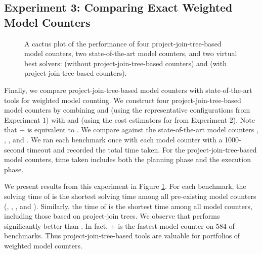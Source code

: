 
\subsection{Experiment 3: Comparing Exact Weighted Model Counters}
\label{sec_experiments_wmc}

\begin{figure}[t]
	\centering
	
    \vspace*{-1cm}
	\caption{\label{fig:comparison} A cactus plot of the performance of four project-join-tree-based model counters, two state-of-the-art model counters, and two virtual best solvers:  (without project-join-tree-based counters) and  (with project-join-tree-based counters).}
\end{figure}

Finally, we compare project-join-tree-based model counters with state-of-the-art tools for weighted model counting.
We construct four project-join-tree-based model counters by combining \Htb{} and \Lg{} (using the representative configurations from Experiment 1) with \Dmc{} and \Tensor{} (using the cost estimators for \Lg{} from Experiment 2).
Note that \Dmc{}+\Htb{} is equivalent to  \cite{DPV20}.
We compare against the state-of-the-art model counters \cachet{} \cite{sang2004combining}, \ctd{} \cite{darwiche2004new}, \df{} \cite{LM17}, and \minictd{} \cite{OD15}.
We ran each benchmark once with each model counter with a 1000-second timeout and recorded the total time taken.
For the project-join-tree-based model counters, time taken includes both the planning phase and the execution phase.

We present results from this experiment in Figure \ref{fig:comparison}.
For each benchmark, the solving time of  is the shortest solving time among all pre-existing model counters (\cachet, \ctd, \df, and \minictd).
Similarly, the time of  is the shortest time among all model counters, including those based on project-join trees.
We observe that  performs significantly better than .
In fact, \Dmc{}+\Lg{} is the fastest model counter on 584 of \benchmarkCountAltogether{} benchmarks.
Thus project-join-tree-based tools are valuable for portfolios of weighted model counters.
